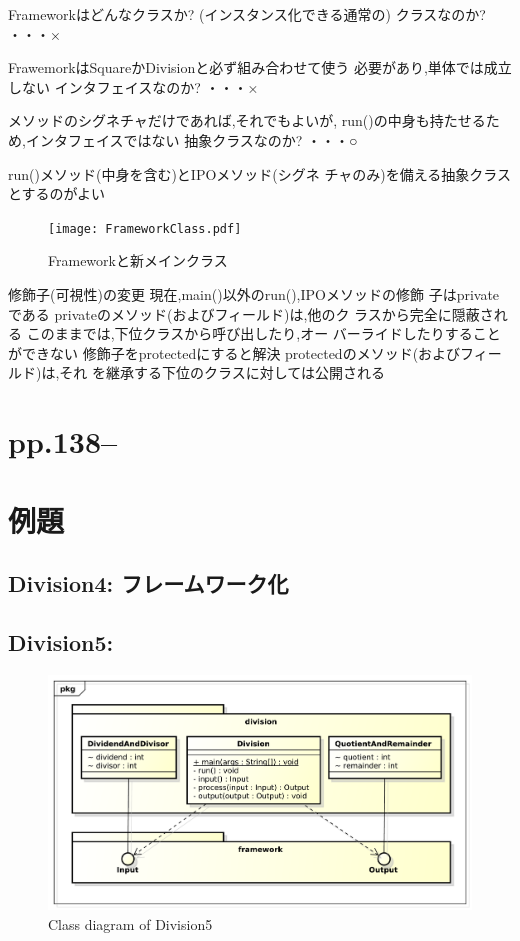 \documentclass[a4j, twoside]{jsbook}
\begin{document}
Frameworkはどんなクラスか?
(インスタンス化できる通常の)
クラスなのか?
・・・×

 FrawemorkはSquareかDivisionと必ず組み合わせて使う
必要があり,単体では成立しない
インタフェイスなのか?
・・・×

 メソッドのシグネチャだけであれば,それでもよいが,
run()の中身も持たせるため,インタフェイスではない
抽象クラスなのか?
・・・○

 run()メソッド(中身を含む)とIPOメソッド(シグネ
チャのみ)を備える抽象クラスとするのがよい

\begin{figure}
 \begin{center}
  \texttt{[image: FrameworkClass.pdf]}
  \caption{Frameworkと新メインクラス}
 \end{center}
\end{figure}

修飾子(可視性)の変更
現在,main()以外のrun(),IPOメソッドの修飾
子はprivateである
 privateのメソッド(およびフィールド)は,他のク
ラスから完全に隠蔽される
 このままでは,下位クラスから呼び出したり,オー
バーライドしたりすることができない
修飾子をprotectedにすると解決
 protectedのメソッド(およびフィールド)は,それ
を継承する下位のクラスに対しては公開される

\section{pp.138--}

\newpage

\section{例題}
\subsection{Division4: フレームワーク化}


\subsection{Division5: }

\begin{figure}
 \includegraphics[width=\textwidth]{figures/Division5.pdf}
 \caption{Class diagram of Division5}
\end{figure}
\end{document}
